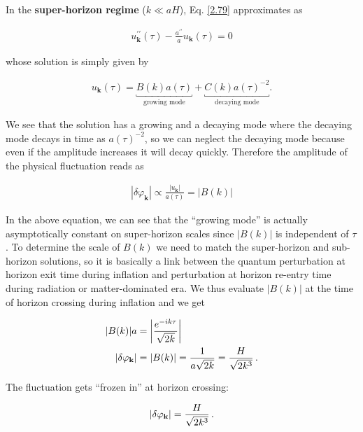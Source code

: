 In the \textbf{super-horizon regime} ($k \ll aH$), Eq. \ref{2.79} approximates as

\begin{align}
    u_{\mathbf{k}}^{\prime \prime}(\tau)-\frac{a^{\prime \prime}}{a} u_{\mathbf{k}}(\tau)=0 \label{2.81}
\end{align}



whose solution is simply given by

\begin{align}
    u_{\mathbf{k}}(\tau)=\underbracket{B(k) a(\tau)}_{\text{growing mode}}+ \underbracket{C(k) a(\tau)^{-2}}_{\text{decaying mode}} .\label{2.82}
\end{align}

 We see that the solution has a growing and a decaying mode where the decaying mode decays in time as $a(\tau)^{-2}$, so we can neglect the decaying mode because even if the amplitude increases it will decay quickly. Therefore the amplitude of the physical fluctuation reads as

\begin{align}
    \left|\delta \varphi_{\mathbf{k}}\right| \propto \frac{\left|u_{\mathbf{k}}\right|}{a(\tau)}=|B(k)| \label{2.83}
\end{align}

In the above equation, we can see that the “growing
mode” is actually asymptotically constant on super-horizon scales since $|B(k)|$ is independent of $\tau$.
To determine the scale of $B(k)$ we need to match the super-horizon and sub-horizon solutions, so it is basically a link between the quantum perturbation at horizon exit time during inflation and perturbation at horizon re-entry time during radiation or matter-dominated era. We thus evaluate $|B(k)|$ at the time of horizon crossing during inflation and we get

\begin{align}
    \abs{B(k)} a &= \abs{\frac{e^{-ik \tau }}{\sqrt{2 k}}} \label{2.84}  \\
    \abs{ \delta \varphi _\textbf{k}} &= \abs{B(k)} = \frac{1}{a \sqrt{2k}} 
    = \frac{H}{\sqrt{2 k^3}}\label{2.85}
    \,.
\end{align}

The fluctuation gets ``frozen in'' at horizon crossing: 

\begin{align}
    \abs{ \delta \varphi _\textbf{k}} = \frac{H}{\sqrt{2 k^3}}
    \,.
\end{align}


